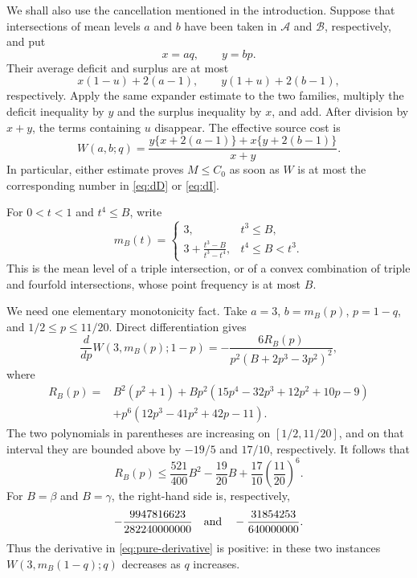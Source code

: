 \documentclass[11pt,a4paper]{amsart}
\newcommand{\cA}{\mathcal A}
\newcommand{\cB}{\mathcal B}
\begin{document}
We shall also use the cancellation mentioned in the introduction.  Suppose
that intersections of mean levels \(a\) and \(b\) have been taken in
\(\cA\) and \(\cB\), respectively, and put
\[
        x=aq,\qquad y=bp.
\]
Their average deficit and surplus are at most
\[
 x(1-u)+2(a-1),\qquad y(1+u)+2(b-1),
\]
respectively.  Apply the same expander estimate to the two families, multiply
the deficit inequality by \(y\) and the surplus inequality by \(x\), and add.
After division by \(x+y\), the terms containing \(u\) disappear.  The
effective source cost is
\begin{equation}\label{eq:W}
 W(a,b;q)=
 \frac{y\{x+2(a-1)\}+x\{y+2(b-1)\}}{x+y}.
\end{equation}
In particular, either estimate proves \(M\leqslant C_0\) as soon as \(W\) is
at most the corresponding number in \eqref{eq:dD} or \eqref{eq:dI}.

For \(0<t<1\) and \(t^4\leqslant B\), write
\begin{equation}\label{eq:mB}
 m_B(t)=
 \begin{cases}
 3,&t^3\leqslant B,\\[2mm]
 \displaystyle 3+\frac{t^3-B}{t^3-t^4},&t^4\leqslant B<t^3.
 \end{cases}
\end{equation}
This is the mean level of a triple intersection, or of a convex combination
of triple and fourfold intersections, whose point frequency is at most \(B\).

We need one elementary monotonicity fact.  Take \(a=3\),
\(b=m_B(p)\), \(p=1-q\), and \(1/2\leqslant p\leqslant11/20\).  Direct
differentiation gives
\begin{equation}\label{eq:pure-derivative}
 \frac{d}{dp}W(3,m_B(p);1-p)
 =
 -\frac{6R_B(p)}
 {p^2(B+2p^3-3p^2)^2},
\end{equation}
where
\[
\begin{split}
 R_B(p)={}&B^2(p^2+1)
 +Bp^2(15p^4-32p^3+12p^2+10p-9)\\
 &+p^6(12p^3-41p^2+42p-11).
\end{split}
\]
The two polynomials in parentheses are increasing on
\([1/2,11/20]\), and on that interval they are bounded above by
\(-19/5\) and \(17/10\), respectively.  It follows that
\[
 R_B(p)\leqslant
 \frac{521}{400}B^2-\frac{19}{20}B
 +\frac{17}{10}\left(\frac{11}{20}\right)^6.
\]
For \(B=\beta\) and \(B=\gamma\), the right-hand side is, respectively,
\[
 -\frac{9947816623}{282240000000}
 \quad\hbox{and}\quad
 -\frac{31854253}{640000000}.
\]
Thus the derivative in \eqref{eq:pure-derivative} is positive: in these two
instances \(W(3,m_B(1-q);q)\) decreases as \(q\) increases.
\end{document}
